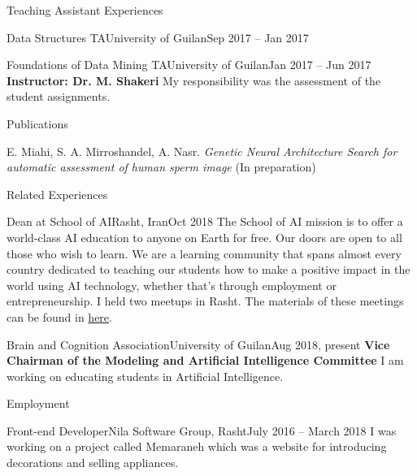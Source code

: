 \documentclass[]{mcdowellcv}
\begin{document}
\begin{cvsection}{Teaching Assistant Experiences}
\begin{cvsubsection}{Data Structures TA}{University of Guilan}{Sep 2017 -- Jan 2017}
    	\end{cvsubsection}
    	
    	\begin{cvsubsection}{Foundations of Data Mining TA}{University of Guilan}{Jan 2017 -- Jun 2017}
    	    \setlength{\columnsep}{-2.1in}
    	    \textbf{Instructor: Dr. M. Shakeri} \newline
    	    My responsibility was the assessment of the student assignments.
    	\end{cvsubsection}
    
    \end{cvsection}
    
    \begin{cvsection}{Publications}
    	\begin{cvsubsection}{}{}{}
        	E. Miahi, S. A. Mirroshandel, A. Nasr. \textit{Genetic Neural Architecture Search for automatic assessment of human sperm image} (In preparation)
    	\end{cvsubsection}

    \end{cvsection}

    
	\begin{cvsection}{Related Experiences}
    		\begin{cvsubsection}{Dean at School of AI}{Rasht, Iran}{Oct 2018}
				The School of AI mission is to offer a world-class AI education to anyone on Earth for free. Our doors
				are open to all those who wish to learn. We are a learning community that spans almost every country
				dedicated to teaching our students how to make a positive impact in the world using AI technology, whether
				that's through employment or entrepreneurship.
				I held two meetups in Rasht. The materials of these meetings can be found in \href{https://github.com/school-of-ai-rasht-chapter/Meetup-Materials}{here}.
    		\end{cvsubsection}
    		
    		\begin{cvsubsection}{Brain and Cognition Association}{University of Guilan}{Aug 2018, present}
		        \textbf{Vice Chairman of the Modeling and Artificial Intelligence Committee} \newline
		        I am working on educating students in Artificial Intelligence.
    		\end{cvsubsection}
    		
    \end{cvsection}
    

	\begin{cvsection}{Employment}
    	
    		\begin{cvsubsection}{Front-end Developer}{Nila Software Group, Rasht}{July 2016 – March 2018}
                I was working on a project called Memaraneh which was a website for introducing decorations and selling appliances.
    		\end{cvsubsection}
    
    \end{cvsection}
    
\end{document}
